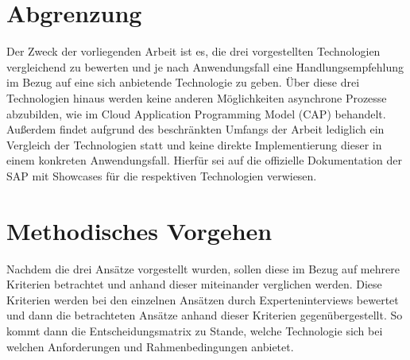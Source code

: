 \section{Abgrenzung}

Der Zweck der vorliegenden Arbeit ist es, die drei vorgestellten Technologien vergleichend zu bewerten und je nach Anwendungsfall eine Handlungsempfehlung im Bezug auf eine sich anbietende Technologie zu geben. Über diese drei Technologien hinaus werden keine anderen Möglichkeiten asynchrone Prozesse abzubilden, wie \zB im Cloud Application Programming Model (CAP) behandelt. Au{\ss}erdem findet aufgrund des beschränkten Umfangs der Arbeit lediglich ein Vergleich der Technologien statt und keine direkte Implementierung dieser in einem konkreten Anwendungsfall. Hierfür sei auf die offizielle Dokumentation der SAP mit Showcases für die respektiven Technologien verwiesen.

\section{Methodisches Vorgehen}

Nachdem die drei Ansätze vorgestellt wurden, sollen diese im Bezug auf mehrere Kriterien betrachtet und anhand dieser miteinander verglichen werden. Diese Kriterien werden bei den einzelnen Ansätzen durch Experteninterviews bewertet und dann die betrachteten Ansätze anhand dieser Kriterien gegenübergestellt. So kommt dann die Entscheidungsmatrix zu Stande, welche Technologie sich bei welchen Anforderungen und Rahmenbedingungen anbietet.

